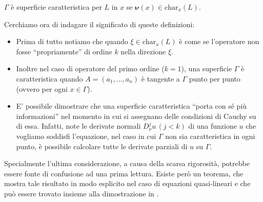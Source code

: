 \begin{definition} \label{supcarlin}
$\Gamma$ è superficie caratteristica per $L$ in $x$ se $\boldsymbol{\nu}(x) \in\text{char}_x (L)$.
\end{definition}

Cerchiamo ora di indagare il significato di queste definizioni:
\begin{itemize}
\item Prima di tutto notiamo che quando $\xi \in \text{char}_x (L)$ è come se l'operatore non fosse ``propriamente'' di ordine $k$ nella direzione $\xi$.
\item Inoltre nel caso di operatore del primo ordine ($k=1$), una superficie $\Gamma$ è caratteristica quando $A=(a_1,\ldots ,a_n)$ è tangente a $\Gamma$ punto per punto (ovvero per ogni $x\in \Gamma$).
\item E' possibile dimostrare che una superficie caratteristica ``porta con sé più informazioni'' nel momento in cui si assegnano delle condizioni di Cauchy su di essa. Infatti, note le derivate normali $D^j_\nu u \,(j<k)$ di una funzione $u$ che vogliamo soddisfi l'equazione, nel caso in cui $\Gamma$ non sia caratteristica in ogni punto, è possibile calcolare tutte le derivate parziali di $u$ su $\Gamma$.
\end{itemize}
\newpage
Specialmente l'ultima considerazione, a causa della scarsa rigorosità, potrebbe essere fonte di confusione ad una prima lettura. Esiste però un teorema, che mostra tale risultato in modo esplicito nel caso di equazioni quasi-lineari e che può essere trovato insieme alla dimostrazione in \cite[cap.4.6]{Evans}.

